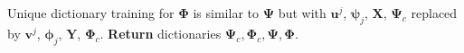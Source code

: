 \documentclass{article}
\begin{document}
\begin{algorithm}[t]
\begin{algorithmic}[1]
			\STATE
			\textrm{Unique dictionary training for $\boldsymbol{\Phi}$ is similar to $\boldsymbol{\Psi}$ but with $\mathbf{u}^j$, $\boldsymbol{\psi}_j$, $\mathbf{X}$, $\boldsymbol{\Psi}_c$ replaced by $\mathbf{v}^j$, $\boldsymbol{\phi}_j$}, $\mathbf{Y}$, $\boldsymbol{\Phi}_c$.
			\STATE
			\textbf{Return} dictionaries $\boldsymbol{\Psi}_{c}, \boldsymbol{\Phi}_{c},\boldsymbol{\Psi}, \boldsymbol{\Phi}$.
		\end{algorithmic}
\end{algorithm}	
\end{document}
